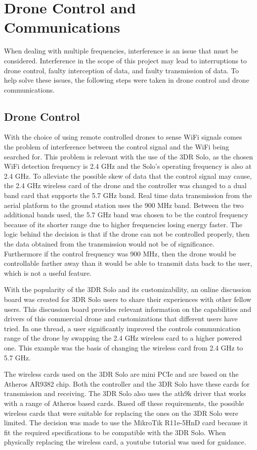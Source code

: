\section{Drone Control and Communications}
When dealing with multiple frequencies, interference is an issue that must be considered. Interference in the scope of this project may lead to interruptions to drone control, faulty interception of data, and faulty transmission of data. To help solve these issues, the following steps were taken in drone control and drone communications.\par 

\subsection{Drone Control}
With the choice of using remote controlled drones to sense WiFi signals comes the problem of interference between the control signal and the WiFi being searched for. This problem is relevant with the use of the 3DR Solo, as the chosen WiFi detection frequency is 2.4 GHz and the Solo’s operating frequency is also at 2.4 GHz. To alleviate the possible skew of data that the control signal may cause, the 2.4 GHz wireless card of the drone and the controller was changed to a dual band card that supports the 5.7 GHz band. Real time data transmission from the aerial platform to the ground station uses the 900 MHz band. Between the two additional bands used, the 5.7 GHz band was chosen to be the control frequency because of its shorter range due to higher frequencies losing energy faster. The logic behind the decision is that if the drone can not be controlled properly, then the data obtained from the transmission would not be of significance. Furthermore if the control frequency was 900 MHz, then the drone would be controllable farther away than it would be able to transmit data back to the user, which is not a useful feature.\par 
With the popularity of the 3DR Solo and its customizability, an online discussion board was created for 3DR Solo users to share their experiences with other fellow users. This discussion board provides relevant information on the capabilities and drivers of this commercial drone and customizations that different users have tried. In one thread, a user significantly improved the controls communication range of the drone by swapping the 2.4 GHz wireless card to a higher powered one. This example was the basis of changing the wireless card from 2.4 GHz to 5.7 GHz.\par 
The wireless cards used on the 3DR Solo are mini PCIe and are based on the Atheros AR9382 chip. Both the controller and the 3DR Solo have these cards for transmission and receiving. The 3DR Solo also uses the ath9k driver that works with a range of Atheros based cards. Based off these requirements, the possible wireless cards that were suitable for replacing the ones on the 3DR Solo were limited. The decision was made to use the MikroTik R11e-5HnD card because it fit the required specifications to be compatible with the 3DR Solo. When physically replacing the wireless card, a youtube tutorial was used for guidance. \par 

